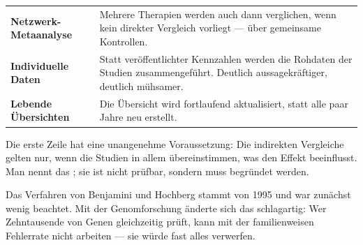 \begin{forschung}
\begin{center}
{\small
\renewcommand{\arraystretch}{1.45}
\begin{tabular}{@{}P{2.8cm}P{5.4cm}@{}}
\toprule
\textbf{Netzwerk-Metaanalyse} & Mehrere Therapien werden auch dann verglichen, wenn kein direkter Vergleich vorliegt --- über gemeinsame Kontrollen.\\
\textbf{Individuelle Daten} & Statt veröffentlichter Kennzahlen werden die Rohdaten der Studien zusammengeführt. Deutlich aussagekräftiger, deutlich mühsamer.\\
\textbf{Lebende Übersichten} & Die Übersicht wird fortlaufend aktualisiert, statt alle paar Jahre neu erstellt.\\
\bottomrule
\end{tabular}}
\end{center}

Die erste Zeile hat eine unangenehme Voraussetzung: Die indirekten Vergleiche gelten nur, wenn die Studien in allem übereinstimmen, was den Effekt beeinflusst. Man nennt das ; sie ist nicht prüfbar, sondern muss begründet werden.

Das Verfahren von Benjamini und Hochberg stammt von 1995 und war zunächst wenig beachtet. Mit der Genomforschung änderte sich das schlagartig: Wer Zehntausende von Genen gleichzeitig prüft, kann mit der familienweisen Fehlerrate nicht arbeiten --- sie würde fast alles verwerfen.

\begin{center}
\begin{minipage}{0.88\textwidth}
\end{minipage}
\end{center}
\end{forschung}

